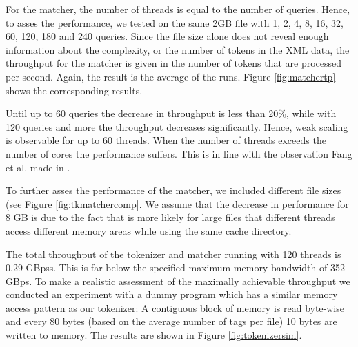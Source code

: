 For the matcher, the number of threads is equal to the number of queries. Hence,
to asses the performance, we tested on the same 2GB file with 1, 2, 4, 8, 16,
32, 60, 120, 180 and 240 queries. Since the file size alone does not reveal
enough information about the complexity, or the number of tokens in the XML
data, the throughput for the matcher is given in the number of tokens that are
processed per second. Again, the result is the average of the runs.  Figure
\ref{fig:matchertp} shows the corresponding results.

Until up to 60 queries the decrease in throughput is less than 20\%, while with
120 queries and more the throughput decreases significantly. Hence, weak scaling
is observable for up to 60 threads. When the number of threads exceeds the
number of cores the performance suffers. This is in line with the observation
Fang et al. made in \cite{Fang14}.

To further asses the performance of the matcher, we included different file
sizes (see Figure \ref{fig:tkmatchercomp}. We assume that the decrease in
performance for 8 GB is due to the fact that is more likely for large files that
different threads access different memory areas while using the same cache
directory.

The total throughput of the tokenizer and matcher running with 120 threads is
0.29 GBpss. This is far below the specified maximum memory bandwidth of 352
GBps. To make a realistic assessment of the maximally achievable throughput
we conducted an experiment with a dummy program which has a similar memory
access pattern as our tokenizer: A contiguous block of memory is read byte-wise
and every 80 bytes (based on the average number of tags per file) 10 bytes are
written to memory. The results are shown in Figure \ref{fig:tokenizersim}.

